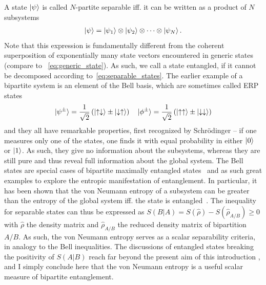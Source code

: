 A state $\ket{\psi}$ is called $N$-partite separable iff. it can be written as a product of $N$ subsystems~\cite{Horodecki2009}
\begin{align}
    \ket{\psi} = \ket{\psi_1}\otimes\ket{\psi_2}\otimes\dots\otimes\ket{\psi_N}.
    \label{eq:separable_states}
\end{align}
Note that this expression is fundamentally different from the coherent superposition of exponentially many state vectors encountered in generic states (compare to ~\cref{eq:generic_state}).
As such, we call a state entangled, if it cannot be decomposed according to~\cref{eq:separable_states}.
The earlier example of a bipartite system is an element of the Bell basis, which are sometimes called ERP states
\begin{align}
    \ket{\psi^\pm}=\frac 1{\sqrt2}\left( \ket{\uparrow\downarrow}\pm\ket{\downarrow\uparrow} \right)
    \quad
    \ket{\phi^\pm}=\frac 1{\sqrt2}\left( \ket{\uparrow\uparrow}\pm\ket{\downarrow\downarrow} \right)
\end{align}
and they all have remarkable properties, first recognized by Schrödinger -- if one measures only one of the states, one finds it with equal probability in either $\ket{0}$ or $\ket{1}$.
As such, they give no information about the subsystems, whereas they are still pure and thus reveal full information about the global system.
The Bell states are special cases of bipartite maximally entangled states~\cite{Horodecki2009} and as such great examples to explore the entropic manifestation of entanglement.
In particular, it has been shown that the von Neumann entropy of a subsystem can be greater than the entropy of the global system iff. the state is entangled~\cite{Horodecki1994}.
The inequality for separable states can thus be expressed as $S(B|A)=S(\hat\rho)-S(\hat\rho_{A/B})\geq0$ with $\hat\rho$ the density matrix and $\hat\rho_{A/B}$ the reduced density matrix of bipartition $A/B$.
As such, the von Neumann entropy serves as a scalar separability criteria, in analogy to the Bell inequalities.
The discussions of entangled states breaking the positivity of $S(A|B)$ reach far beyond the present aim of this introduction \cite{Horodecki2006}, and I simply conclude here that the von Neumann entropy is a useful scalar measure of bipartite entanglement.

